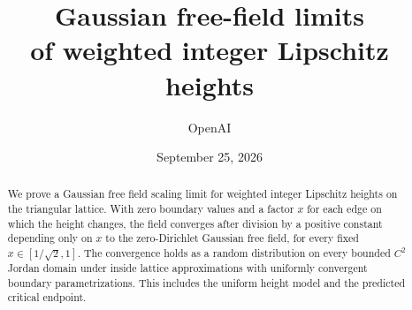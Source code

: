 \documentclass[11pt]{article}
\title{Gaussian free-field limits\\of weighted integer Lipschitz heights}
\author{OpenAI}
\date{September 25, 2026}
\theoremstyle{definition}
\theoremstyle{remark}
\numberwithin{equation}{section}
\begin{document}
\maketitle
\begin{abstract}
We prove a Gaussian free field scaling limit for weighted integer Lipschitz
heights on the triangular lattice. With zero boundary values and a factor $x$
for each edge on which the height changes, the field converges after division
by a positive constant depending only on $x$ to the zero-Dirichlet Gaussian
free field, for every fixed $x\in[1/\sqrt2,1]$. The convergence holds as a
random distribution on every bounded $C^2$ Jordan domain under inside lattice
approximations with uniformly convergent boundary parametrizations. This
includes the uniform height model and the predicted critical endpoint.
\end{abstract}

\tableofcontents









\appendix




\end{document}
